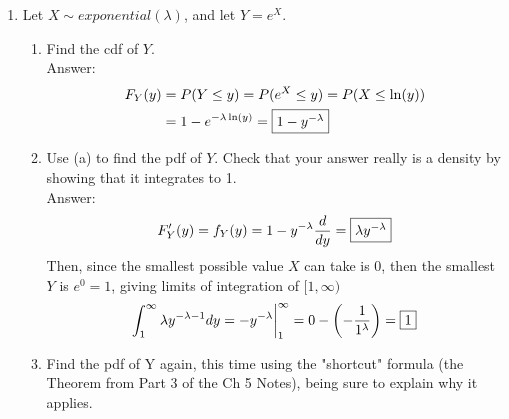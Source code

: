 \documentclass{article}
\begin{document}
\begin{enumerate}
\begin{enumerate}
                    \\Answer:\\
                    Given that $-\ln\left(\frac{1}{2}\right) \approx 0.693$, the average appliance will last longer 
                    than 50\% of other such appliances. This would lead to the manufacturer likely advertising the 
                    average lifespan of the appliance.
        \end{enumerate}
    \clearpage
    \item   Let $X \sim exponential(\lambda)$, and let $Y = e^X$.
        \begin{enumerate}
            \item   Find the cdf of $Y$.
                \\Answer:
                \begin{align*}
                    F_Y(y) &= P(Y\leq y) = P(e^X \leq y) = P(X \leq \ln(y))\\
                           &= 1 - e^{-\lambda \ln(y)} = \fbox{$1 - y^{-\lambda}$}
                \end{align*}
            \item   Use (a) to find the pdf of $Y$. Check that your answer really is a density by showing 
                    that it integrates to 1.
                \\Answer:
                $$ F'_Y(y) = f_Y(y) = 1 - y^{-\lambda} \frac{d}{dy} = \fbox{$\lambda y^{-\lambda}$}$$
                Then, since the smallest possible value $X$ can take is 0, then the smallest $Y$ is $e^0 = 1$, 
                giving limits of integration of $[1,\infty)$
                $$ 
                    \int^{\infty}_{1} \lambda y^{-\lambda -1} dy = 
                    {-y^{-\lambda}}\bigg|^{\infty}_{1} = 0 - \left(-\frac{1}{1^\lambda}\right) = \fbox{1}
                $$
            \item   Find the pdf of Y again, this time using the "shortcut" formula (the Theorem from Part 3 of the Ch 5 Notes), 
                    being sure to explain why it applies.
        \end{enumerate}
\end{enumerate}
\end{document}
